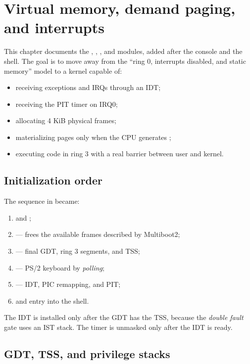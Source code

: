 \chapter{Virtual memory, demand paging, and interrupts}
\label{cap:memoria-usuario}

This chapter documents the , ,
, and  modules, added after the console and the shell.
The goal is to move away from the ``ring 0, interrupts disabled, and
static memory'' model to a kernel capable of:

\begin{itemize}
  \item receiving exceptions and IRQs through an IDT;
  \item receiving the PIT timer on IRQ0;
  \item allocating 4 KiB physical frames;
  \item materializing pages only when the CPU generates ;
  \item executing code in ring 3 with a real barrier between user and
        kernel.
\end{itemize}

\section{Initialization order}

The sequence in  became:

\begin{enumerate}
  \item {} and ;
  \item {} --- frees the available frames
        described by Multiboot2;
  \item {} --- final GDT, ring 3 segments, and TSS;
  \item {} --- PS/2 keyboard by \emph{polling};
  \item {} --- IDT, PIC remapping, and PIT;
  \item {} and entry into the shell.
\end{enumerate}

The IDT is installed only after the GDT has the TSS, because the
\emph{double fault} gate uses an IST stack. The timer is unmasked only after
the IDT is ready.

\section{GDT, TSS, and privilege stacks}

